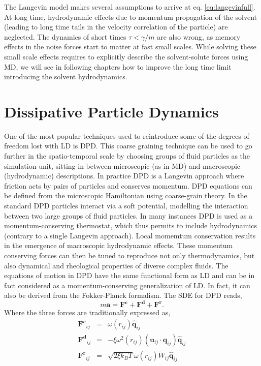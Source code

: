 \documentclass[ twoside,openright,titlepage,numbers=noenddot,%
headinclude,footinclude,cleardoublepage=empty,abstract=on,
BCOR=5mm,paper=a4,fontsize=11pt, dvipsnames
]{scrreprt}
\renewcommand{\vec}[1]{\bm{#1}}
\newcommand{\kT}{k_B T}
\newcommand{\ppos}{q}
\newcommand{\pvel}{u}
\begin{document}
The Langevin model makes several assumptions to arrive at eq. \eqref{eq:langevinfull}. At long time, hydrodynamic effects due to momentum propagation of the solvent (leading to long time tails in the velocity correlation of the particle) are neglected. The dynamics of short times $\tau<\gamma/m$ are also wrong, as memory effects in the noise forces start to matter at fast small scales. While solving these small scale effects requires to explicitly describe the solvent-solute forces using \gls{MD}, we will see in following chapters how to improve the long time limit introducing the solvent hydrodynamics.

\chapter{Dissipative Particle Dynamics}\label{ch:dpd}
One of the most popular techniques used to reintroduce some of the degrees of freedom lost with \gls{LD} is \gls{DPD}. This coarse graining technique can be used to go further in the spatio-temporal scale by choosing groups of fluid particles as the simulation unit, sitting in between microscopic (as in \gls{MD}) and macroscopic (hydrodynamic) descriptions. In practice \gls{DPD} is a Langevin approach where friction acts by pairs of particles and conserves momentum. \gls{DPD} equations can be defined from the microscopic Hamiltonian using coarse-grain theory\cite{Hijon2010}.
In the standard \gls{DPD} particles interact via a soft potential, modelling the interaction between two large groups of fluid particles.
In many instances\cite{BuscalioniPolymers} \gls{DPD} is used as a momentum-conserving thermostat, which thus permits to include hydrodynamics (contrary to a single Langevin approach). Local momemtum conservation results in the emergence of macroscopic hydrodynamic effects. These momentum conserving forces can then be tuned to reproduce not only thermodynamics, but also dynamical and rheological properties of diverse complex fluids.
The equations of motion in \gls{DPD} have the same functional form as \gls{LD} and can be in fact considered as a momentum-conserving generalization of \gls{LD}. In fact, it can also be derived from the Fokker-Planck formalism\cite{dunweg1991}. The \gls{SDE} for \gls{DPD} reads,
\begin{equation}
  \label{eq:dpddyn}
  m\vec{a} = \vec{F^c} + \vec{F^d} + \vec{F^r}.
\end{equation}
Where the three forces are traditionally expressed as,
\begin{equation}
  \label{eq:dpdforces}
  \begin{aligned}
    \vec{F^c}_{ij} &=&\omega(r_{ij})\hat{\vec{\ppos}}_{ij}\\
    \vec{F^d}_{ij} &=&-\xi\omega^2(r_{ij})(\vec{\pvel}_{ij}\cdot\vec{\ppos}_{ij})\hat{\vec{\ppos}}_{ij}\\
    \vec{F^r}_{ij} &=&\sqrt{2\xi\kT}\omega(r_{ij})\widetilde{W}_{ij}\hat{\vec{\ppos}}_{ij}    
  \end{aligned}
\end{equation}
\end{document}
